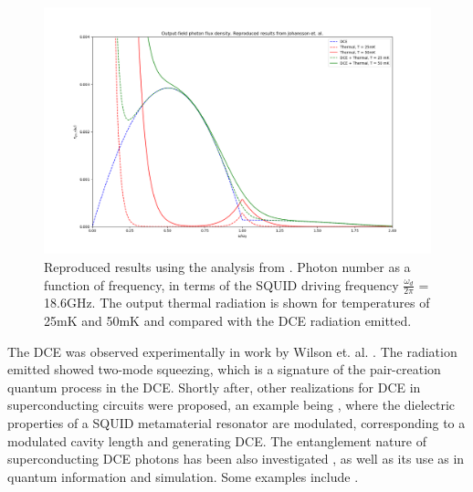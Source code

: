 \begin{figure}
    \centering
    \includegraphics[width=6.5in,keepaspectratio]{figures/intro/Johansson2010_reproduced.png}
    \caption{Reproduced results using the analysis from \protect\cite{Johansson2010}. Photon number as a function of frequency, in terms of the SQUID driving frequency $\frac{\omega_d}{2\pi}$ = 18.6GHz. The output thermal radiation is shown for temperatures of 25mK and 50mK and compared with the DCE radiation emitted.}
    \label{fig:Johansson2010_reproduced}
\end{figure}

\newpage
The DCE was observed experimentally in work by Wilson et. al. \cite{Wilson2011_ObservationDCE}. The radiation emitted showed two-mode squeezing, which is a signature of the pair-creation quantum process in the DCE. Shortly after, other realizations for DCE in superconducting circuits were proposed, an example being \cite{Lahteenmaki_DCE2013}, where the dielectric properties of a SQUID metamaterial resonator are modulated, corresponding to a modulated cavity length and generating DCE. The entanglement nature of superconducting DCE photons has been also investigated \cite{Johansson2013}, as well as its use as in quantum information and simulation. Some examples include \cite{Felicetti2014, Peropadre2018, Agusti2019, Zhao2021}.